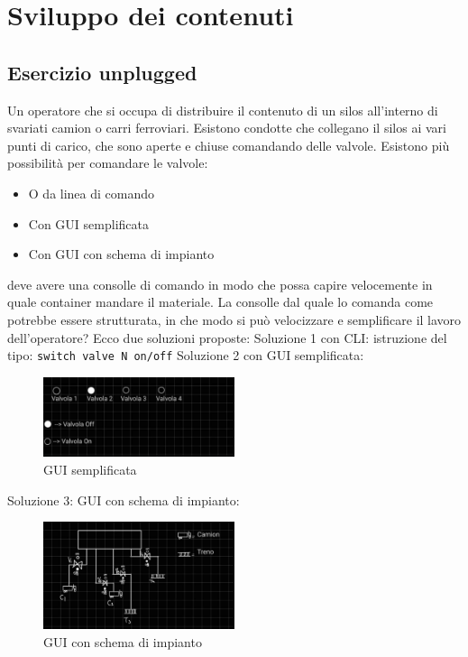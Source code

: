 \section{Sviluppo dei contenuti}

\subsection{Esercizio unplugged}
Un operatore che si occupa di distribuire il contenuto di  un silos all'interno di svariati camion o carri ferroviari. Esistono condotte che collegano il silos ai vari punti di carico, che sono aperte e chiuse comandando delle valvole. 
Esistono più possibilità per comandare le valvole:
\begin{itemize}
\item O da linea di comando 
\item  Con GUI semplificata
\item Con GUI con schema di impianto

\end{itemize}
deve avere una consolle di comando in modo che possa capire velocemente in quale container mandare il materiale.
La consolle dal quale lo comanda come potrebbe essere strutturata, in che modo si può velocizzare e semplificare il lavoro dell'operatore?
Ecco due soluzioni proposte:
Soluzione  1 con CLI: istruzione del tipo: \texttt{switch valve N on/off} \newline
Soluzione 2 con GUI semplificata:
\begin{figure}
  \centering
  \includegraphics[width=0.5\textwidth]{img/gui_sempl.png}
  \caption{GUI semplificata}
\end{figure}


Soluzione 3: GUI con schema di impianto:
\begin{figure}
  \centering
  \includegraphics[width=0.5\textwidth]{img/gui_con_schema.png}
  \caption{GUI con schema di impianto}
\end{figure}


